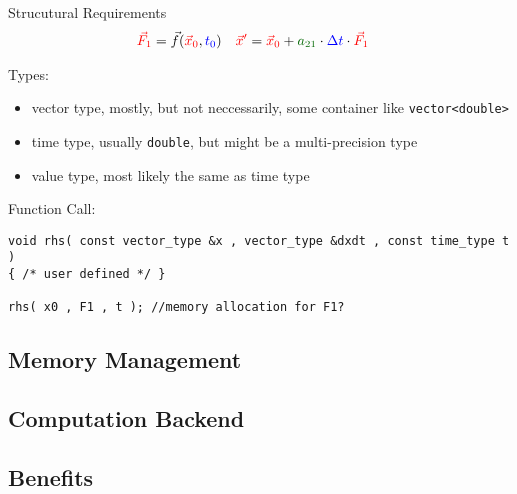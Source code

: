 \begin{frame}[fragile]{Strucutural Requirements}
\begin{align*}
 {\color{red}\vec F_1} &= \vec f( {\color{red}\vec x_0} , {\color{blue}t_0} ) & %
 {\color{red}\vec x'} &= {\color{red}\vec x_0} + {\color{dark-green}a_{21}} \cdot {\color{blue}\Delta t} \cdot {\color{red}\vec F_1}
\end{align*}
 
Types:
\begin{itemize}
 \item {\color{red} vector type}, mostly, but not neccessarily, some container like \lstinline+vector<double>+
 \item {\color{blue} time type}, usually \lstinline+double+, but might be a multi-precision type
 \item {\color{dark-green} value type}, most likely the same as time type
\end{itemize}
\pause
\vspace{0.5em}

Function Call:
\begin{lstlisting}
void rhs( const vector_type &x , vector_type &dxdt , const time_type t )
{ /* user defined */ }

rhs( x0 , F1 , t ); //memory allocation for F1?
\end{lstlisting}


\end{frame}




\subsection{Memory Management}

\subsection{Computation Backend}

\subsection{Benefits}